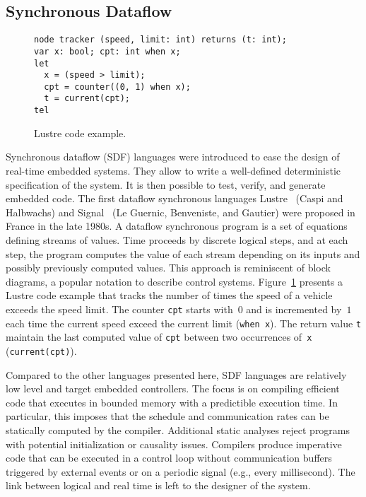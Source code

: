 \subsection{Synchronous Dataflow}\label{sec:sdf} %

\begin{figure}[!h]
\begin{lstlisting}[morekeywords={node,int,bool,returns,var,when,let,tel,current}]
node tracker (speed, limit: int) returns (t: int);
var x: bool; cpt: int when x;
let
  x = (speed > limit);
  cpt = counter((0, 1) when x);
  t = current(cpt);
tel
\end{lstlisting}
\vspace*{-4mm}
\caption{\label{fig:lustre} Lustre code example.}
\end{figure}

Synchronous dataflow (SDF) languages were introduced to ease the design of
real-time embedded systems. They allow to write a well-defined
deterministic specification of the system. It is then possible to
test, verify, and generate embedded code.
The first data\-flow synchronous languages Lustre~\cite{lustre_1987}
(Caspi and Halbwachs) and Signal~\cite{signal_1991} (Le Guernic,
Benveniste, and Gautier) were proposed in France in the late 1980s.
A dataflow synchronous program is a set of equations defining streams
of values. Time proceeds by discrete logical steps, and at each step,
the program computes the value of each stream depending on its inputs
and possibly previously computed values.
This approach is reminiscent of block diagrams, a popular notation to
describe control systems.
Figure~\ref{fig:lustre} presents a Lustre code example that tracks the
number of times the speed of a vehicle exceeds the speed limit. The
counter \lstinline{cpt} starts with~$0$ and is incremented by~$1$ each
time the current speed exceed the current limit (\lstinline{when x}).
The return value \lstinline{t} maintain the last computed value
of \lstinline{cpt} between two occurrences of~\lstinline{x}
(\lstinline{current(cpt)}).

Compared to the other languages presented here, SDF languages are
relatively low level and target embedded controllers. The focus is on
compiling efficient code that executes in bounded memory with a
predictible execution time.  In particular, this imposes that the
schedule and communication rates can be statically computed by the
compiler. Additional static analyses reject programs with potential
initialization or causality issues. Compilers produce imperative code
that can be executed in a control loop without communication buffers
triggered by external events or on a periodic signal (e.g., every
millisecond). The link between logical and real time is left to the
designer of the system.

